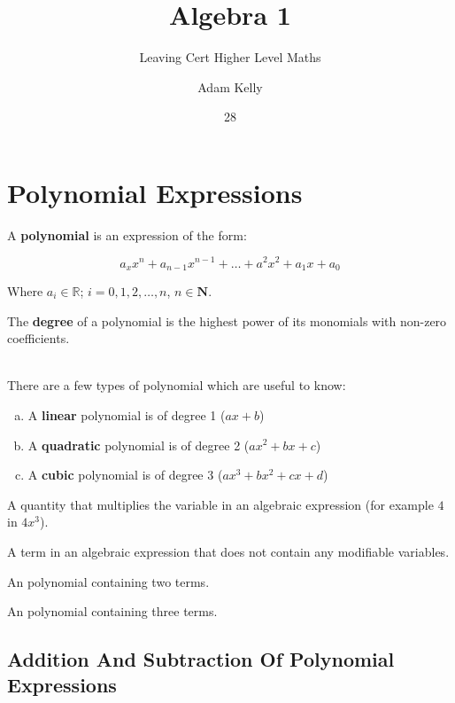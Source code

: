 \documentclass[english,course]{lecture}
\title{Algebra 1}
\subtitle{Leaving Cert Higher Level Maths}
\author{Adam Kelly}
\date{28}{08}{2018}
\begin{document}
\section{Polynomial Expressions}


\begin{definition}[Polynomial]
	A \textbf{polynomial} is an expression of the form:

	$$
		a_x x^n + a_{n-1} x^{n - 1} + \dots + a^2 x^2 + a_1 x + a_0
	$$

	Where $a_i \in \mathbb{R}$; $i = 0, 1, 2, \dots, n$, $n \in \mathbf{N}$.
\end{definition}

\begin{definition}[Degree]
	The \textbf{degree} of a polynomial is the highest power of its monomials with non-zero coefficients.
\end{definition}

\\
There are a few types of polynomial which are useful to know:

\begin{enumerate}[a)]
	\item A \textbf{linear} polynomial is of degree 1 ($ax + b$)
	\item A \textbf{quadratic} polynomial is of degree 2 ($ax^2 + bx + c$)
	\item A \textbf{cubic} polynomial is of degree 3 ($ax^3 + bx^2 + cx + d$)
\end{enumerate}

\begin{definition}[Coefficent]
	A quantity that multiplies the variable in an algebraic expression (for example $4$ in $4x^3$).
\end{definition}

\begin{definition}
	A term in an algebraic expression that does not contain any modifiable variables.
\end{definition}

\begin{definition}[Binomial]
	An polynomial containing two terms.
\end{definition}

\begin{definition}[Trinomial]
	An polynomial containing three terms.
\end{definition}

\subsection{Addition And Subtraction Of Polynomial Expressions}
\end{document}
